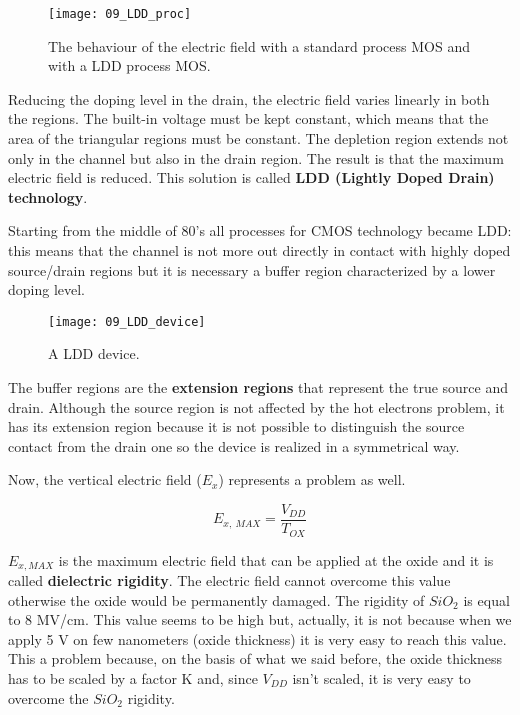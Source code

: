 \documentclass[a4paper, 12pt, twoside, openright]{report}
\begin{document}
	\begin{figure}[H]
	\centering
	\texttt{[image: 09\_LDD\_proc]}
	\caption{The behaviour of the electric field with a standard process MOS and with a LDD process MOS.}
	\label{}
	\end{figure}

Reducing the doping level in the drain, the electric field varies linearly in both the regions. The built-in voltage must be kept constant, which means that the area of the triangular regions must be constant. The depletion region extends not only in the channel but also in the drain region. The result is that the maximum electric field is reduced. This solution is called \textbf{LDD (Lightly Doped Drain) technology}.

Starting from the middle of 80's all processes for CMOS technology became LDD: this means that the channel is not more out directly in contact with highly doped source/drain regions but it is necessary a buffer region characterized by a lower doping level.

 	\begin{figure}[H]
	\centering
	\texttt{[image: 09\_LDD\_device]}
	\caption{A LDD device.}
	\label{}
	\end{figure}

The buffer regions are the \textbf{extension regions} that represent the true source and drain. Although the source region is not affected by the hot electrons problem, it has its extension region because it is not possible to distinguish the source contact from the drain one so the device is realized in a symmetrical way.

Now, the vertical electric field ($E_{x}$) represents a problem as well.

\begin{equation}
E_{x,\ MAX} = \frac{V_{DD}}{T_{OX}}
\end{equation}

$E_{x, MAX}$ is the maximum electric field that can be applied at the oxide and it is called \textbf{dielectric rigidity}. The electric field cannot overcome this value otherwise the oxide would be permanently damaged. The rigidity of $SiO_{2}$ is equal to 8 MV/cm. This value seems to be high but, actually, it is not because when we apply 5 V on few nanometers (oxide thickness) it is very easy to reach this value. This a problem because, on the basis of what we said before, the oxide thickness has to be scaled by a factor K and, since $V_{DD}$ isn't scaled, it is very easy to overcome the $SiO_{2}$ rigidity. \\
\end{document}
